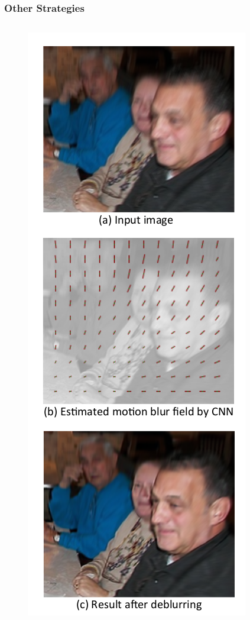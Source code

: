 \documentclass [handout] {beamer}
\begin{document}
\begin{frame}
	\frametitle{Other Strategies}
	\begin{columns}
	\begin{column}{0.4\textwidth}
		\begin{figure}
		\centering
		\includegraphics[scale=0.25]{motion_blur_example.png} 

\end{figure}
\end{column}
\end{columns}
\end{frame}
\end{document}
